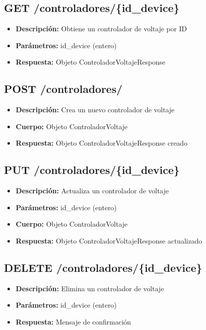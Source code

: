 \documentclass[12pt,letterpaper]{report}
\begin{document}
\subsection{GET /controladores/\{id\_device\}}
\begin{itemize}
    \item \textbf{Descripción:} Obtiene un controlador de voltaje por ID
    \item \textbf{Parámetros:} id\_device (entero)
    \item \textbf{Respuesta:} Objeto ControladorVoltajeResponse
\end{itemize}

\subsection{POST /controladores/}
\begin{itemize}
    \item \textbf{Descripción:} Crea un nuevo controlador de voltaje
    \item \textbf{Cuerpo:} Objeto ControladorVoltaje
    \item \textbf{Respuesta:} Objeto ControladorVoltajeResponse creado
\end{itemize}

\subsection{PUT /controladores/\{id\_device\}}
\begin{itemize}
    \item \textbf{Descripción:} Actualiza un controlador de voltaje
    \item \textbf{Parámetros:} id\_device (entero)
    \item \textbf{Cuerpo:} Objeto ControladorVoltaje
    \item \textbf{Respuesta:} Objeto ControladorVoltajeResponse actualizado
\end{itemize}

\subsection{DELETE /controladores/\{id\_device\}}
\begin{itemize}
    \item \textbf{Descripción:} Elimina un controlador de voltaje
    \item \textbf{Parámetros:} id\_device (entero)
    \item \textbf{Respuesta:} Mensaje de confirmación
\end{itemize}
\end{document}
